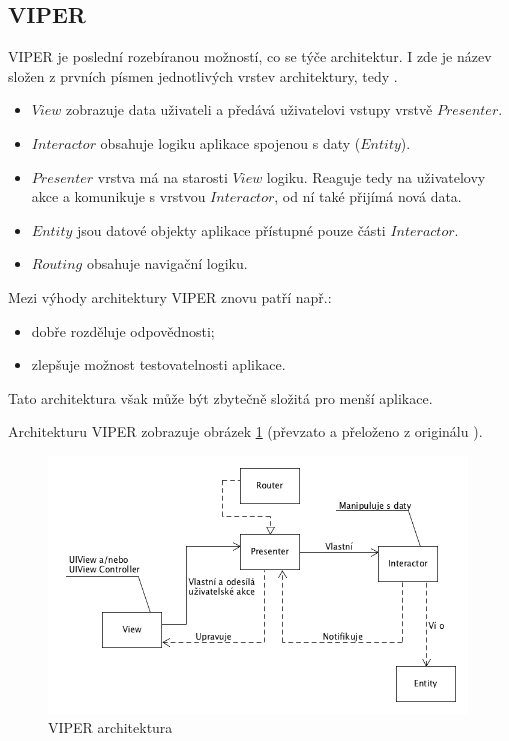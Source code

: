 \documentclass[thesis=M,czech]{FITthesis}[2012/06/26]
\begin{document}
\subsection{VIPER}
VIPER je poslední rozebíranou možností, co se týče architektur. I zde je název složen z prvních písmen jednotlivých vrstev architektury, tedy .
\begin{itemize}
\item $View$  zobrazuje data uživateli a předává uživatelovi vstupy vrstvě $Presenter$.
\item $Interactor$ obsahuje logiku aplikace spojenou s daty ($Entity$).
\item $Presenter$ vrstva má na starosti $View$ logiku.  Reaguje tedy na uživatelovy akce a komunikuje s vrstvou $Interactor$, od ní také přijímá nová data. \cite{Orlov}
\item $Entity$ jsou datové objekty aplikace přístupné pouze části $Interactor$.
\item $Routing$ obsahuje navigační logiku. \cite{VIPER}
\end{itemize}

Mezi výhody architektury VIPER znovu patří např.:
\begin{itemize}
\item dobře rozděluje odpovědnosti;
\item zlepšuje možnost testovatelnosti aplikace. \cite{Orlov}
\end{itemize}

Tato architektura však může být zbytečně složitá pro menší aplikace. \cite{Orlov}

Architekturu VIPER zobrazuje obrázek \ref{fig:viper} (převzato a přeloženo z originálu \cite{viper-pic}).

\begin{figure}[h]\centering
 \includegraphics[width=0.99\textwidth]{./pictures/architektury/viper.png}
 \caption[VIPER architektura]{VIPER architektura}\label{fig:viper}
\end{figure}
\end{document}
